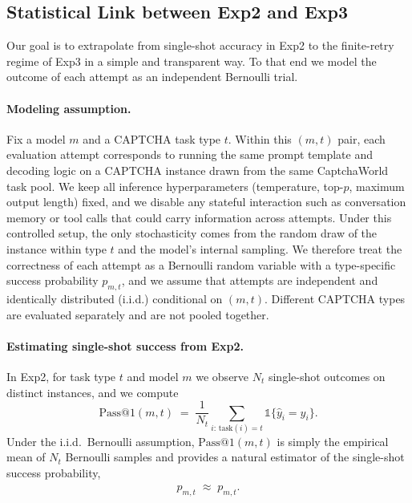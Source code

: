 \documentclass[sigconf, review]{acmart}
\begin{document}
\subsection{Statistical Link between Exp2 and Exp3}
\label{subsec:statlink}

Our goal is to extrapolate from single-shot accuracy in Exp2 to the finite-retry regime of Exp3 in a simple and transparent way. To that end we model the outcome of each attempt as an independent Bernoulli trial.

\paragraph{Modeling assumption.}
Fix a model $m$ and a CAPTCHA task type $t$.
Within this $(m,t)$ pair, each evaluation attempt corresponds to running the same prompt template and decoding logic on a CAPTCHA instance drawn from the same CaptchaWorld task pool.
We keep all inference hyperparameters (temperature, top-$p$, maximum output length) fixed, and we disable any stateful interaction such as conversation memory or tool calls that could carry information across attempts.
Under this controlled setup, the only stochasticity comes from the random draw of the instance within type $t$ and the model’s internal sampling.
We therefore treat the correctness of each attempt as a Bernoulli random variable with a type-specific success probability $p_{m,t}$, and we assume that attempts are independent and identically distributed (i.i.d.) conditional on $(m,t)$.
Different CAPTCHA types are evaluated separately and are not pooled together.

\paragraph{Estimating single-shot success from Exp2.}
In Exp2, for task type $t$ and model $m$ we observe $N_t$ single-shot outcomes on distinct instances, and we compute
\[
  \mathrm{Pass@1}(m,t)
  \;=\;
  \frac{1}{N_t}\sum_{i:\,\mathrm{task}(i)=t}
  \mathbb{1}\{\hat{y}_i = y_i\}.
\]
Under the i.i.d.\ Bernoulli assumption, $\mathrm{Pass@1}(m,t)$ is simply the empirical mean of $N_t$ Bernoulli samples and provides a natural estimator of the single-shot success probability, \[\hat p_{m,t} \;\approx\; p_{m,t}.\]
\end{document}
